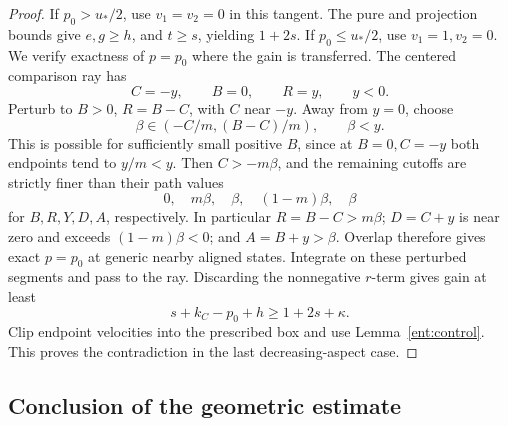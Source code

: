 \begin{proof}
If \(p_0>u_*/2\), use \(v_1=v_2=0\) in this
tangent. The pure and projection bounds give \(e,g\ge h\),
and \(t\ge s\), yielding \(1+2s\).
If \(p_0\le u_*/2\), use \(v_1=1,v_2=0\).
We verify exactness of \(p=p_0\) where the gain is
transferred. The centered comparison ray has
\[
C=-y,\qquad B=0,\qquad R=y,\qquad y<0.
\]
Perturb to \(B>0\), \(R=B-C\), with \(C\)
near \(-y\). Away from \(y=0\), choose
\[
\beta\in(-C/m,(B-C)/m),\qquad \beta<y.
\]
This is possible for sufficiently small positive \(B\),
since at \(B=0,C=-y\) both endpoints tend to
\(y/m<y\). Then \(C>-m\beta\), and the
remaining cutoffs are strictly finer than their path values
\[
0,\quad m\beta,\quad\beta,\quad(1-m)\beta,\quad\beta
\]
for \(B,R,Y,D,A\), respectively. In particular
\(R=B-C>m\beta\); \(D=C+y\) is near zero
and exceeds \((1-m)\beta<0\); and
\(A=B+y>\beta\). Overlap therefore gives exact
\(p=p_0\) at generic nearby aligned states.
Integrate on these perturbed segments and pass to the ray.
Discarding the nonnegative \(r\)-term gives gain at least
\[
s+k_C-p_0+h\ge1+2s+\kappa.
\]
Clip endpoint velocities into the prescribed box and use
Lemma~\ref{ent:control}. This proves the contradiction in
the last decreasing-aspect case.
\end{proof}

\subsection{Conclusion of the geometric estimate}

